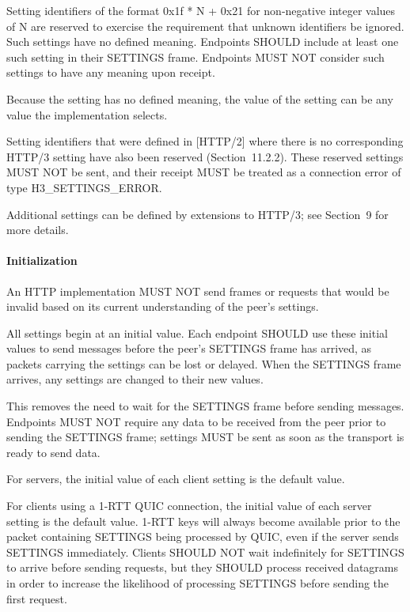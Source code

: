 \documentclass{article}
\begin{document}
Setting identifiers of the format 0x1f * N + 0x21 for non-negative integer values of N are reserved to exercise the requirement that unknown identifiers be ignored.  Such settings have no defined meaning.  Endpoints SHOULD include at least one such setting in their SETTINGS frame.  Endpoints MUST NOT consider such settings to have any meaning upon receipt.

Because the setting has no defined meaning, the value of the setting can be any value the implementation selects.

Setting identifiers that were defined in [HTTP/2] where there is no corresponding HTTP/3 setting have also been reserved (Section~11.2.2).  These reserved settings MUST NOT be sent, and their receipt MUST be treated as a connection error of type H3\_SETTINGS\_ERROR.

Additional settings can be defined by extensions to HTTP/3; see Section~9 for more details.

\paragraph{Initialization}

An HTTP implementation MUST NOT send frames or requests that would be invalid based on its current understanding of the peer's settings.

All settings begin at an initial value.  Each endpoint SHOULD use these initial values to send messages before the peer's SETTINGS frame has arrived, as packets carrying the settings can be lost or delayed.  When the SETTINGS frame arrives, any settings are changed to their new values.

This removes the need to wait for the SETTINGS frame before sending messages.  Endpoints MUST NOT require any data to be received from the peer prior to sending the SETTINGS frame; settings MUST be sent as soon as the transport is ready to send data.

For servers, the initial value of each client setting is the default value.

For clients using a 1-RTT QUIC connection, the initial value of each server setting is the default value.  1-RTT keys will always become available prior to the packet containing SETTINGS being processed by QUIC, even if the server sends SETTINGS immediately.  Clients SHOULD NOT wait indefinitely for SETTINGS to arrive before sending requests, but they SHOULD process received datagrams in order to increase the likelihood of processing SETTINGS before sending the first request.
\end{document}
